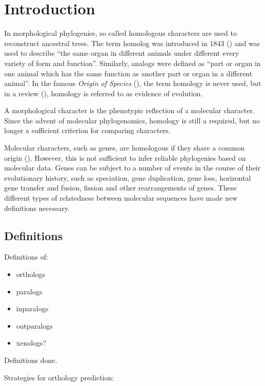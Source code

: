 \section{Introduction}
In morphological phylogenies, so called homologous characters are used to
reconstruct ancestral trees. The term homolog was introduced in 1843
(\cite{owen1848}) and was used to describe ``the same organ in different animals
under different every variety of form and function''. Similarly, analogs were
defined as ``part or organ in one animal which has the same function as another
part or organ in a different animal''. In the famous \emph{Origin of Species}
(\cite{darwin1859}), the term homology is never used, but in a review
(\cite{owen1860}), homology is referred to as evidence of evolution.

A morphological character is the phenotypic reflection of a molecular character.
Since the advent of molecular phylogenomics, homology is still a required, but
no longer a sufficient criterion for comparing characters.

Molecular characters, such as genes, are homologous if they share a common
origin (\cite{koonin2005}). However, this is not sufficient to infer reliable
phylogenies based on molecular data. Genes can be subject to a number of events
in the course of their evolutionary history, such as speciation, gene
duplication, gene loss, horizontal gene transfer and fusion, fission and other
rearrangements of genes. These different types of relatedness between molecular
sequences have made new definitions necessary.

\subsection{Definitions}

Definitions of:
\begin{itemize}
	\item orthologs
	\item paralogs
	\item inparalogs
	\item outparalogs
	\item xenologs?
\end{itemize}

Definitions done.

Strategies for orthology prediction:

